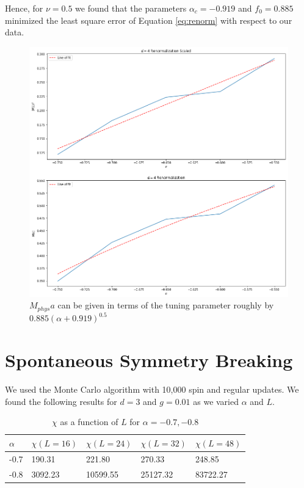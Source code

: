 \documentclass[12]{report}
\newcommand\0{\mathbf{0}}
\newcommand\<{\langle}
\renewcommand\>{\rangle}
\begin{document}
Hence, for $\nu = 0.5$ we found that the parameters $\alpha_c = -0.919$ and $f_0 = 0.885$ minimized the least square error of Equation \ref{eq:renorm} with respect to our data.

\begin{figure}[H]
\centering
\includegraphics[width=\textwidth]{renormalization_4}
\caption{$M_{phys}a$ can be given in terms of the tuning parameter roughly by $0.885(\alpha + 0.919)^{0.5}$}		
\end{figure}

\section{Spontaneous Symmetry Breaking}

We used the Monte Carlo algorithm with 10,000 spin and regular updates. We found the following results for $d =3$ and $g = 0.01$ as we varied $\alpha$ and $L$.

\begin{table}[H]
\centering
\begin{tabular}{|l|l|l|l|l|}
\hline
$\alpha$ & $\chi(L = 16)$ & $\chi(L=24)$ & $\chi(L=32)$ & $\chi(L=48)$ \\ \hline
-0.7   & 190.31 & 221.80 & 270.33 & 248.85 \\
-0.8   & 3092.23 & 10599.55 & 25127.32 & 83722.27  \\ \hline
\end{tabular}
\caption{$\chi$ as a function of $L$ for $\alpha = -0.7, -0.8$}
\end{table}
\end{document}
